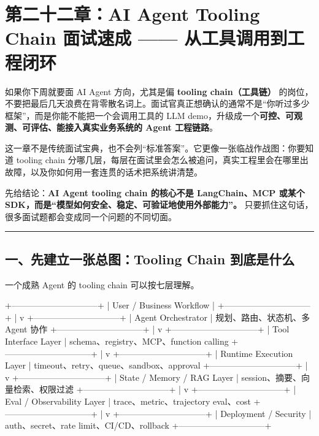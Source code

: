 \chapter{第二十二章：AI Agent Tooling Chain 面试速成 ------ 从工具调用到工程闭环}

如果你下周就要面 AI Agent 方向，尤其是偏 \textbf{tooling chain（工具链）} 的岗位，不要把最后几天浪费在背零散名词上。面试官真正想确认的通常不是``你听过多少框架''，而是你能不能把一个会调用工具的 LLM demo，升级成一个\textbf{可控、可观测、可评估、能接入真实业务系统的 Agent 工程链路}。


这一章不是传统面试宝典，也不会列``标准答案''。它更像一张临战作战图：你要知道 tooling chain 分哪几层，每层在面试里会怎么被追问，真实工程里会在哪里出故障，以及你如何用一套连贯的话术把系统讲清楚。


先给结论：\textbf{AI Agent tooling chain 的核心不是 LangChain、MCP 或某个 SDK，而是``模型如何安全、稳定、可验证地使用外部能力''。} 只要抓住这句话，很多面试题都会变成同一个问题的不同切面。


\bigskip\hrule\bigskip

\section{一、先建立一张总图：Tooling Chain 到底是什么}

一个成熟 Agent 的 tooling chain 可以按七层理解。


\begin{codeblock}
+------------------------------+
|  User / Business Workflow    |
+------------------------------+
              |
              v
+------------------------------+
|  Agent Orchestrator          |  规划、路由、状态机、多 Agent 协作
+------------------------------+
              |
              v
+------------------------------+
|  Tool Interface Layer        |  schema、registry、MCP、function calling
+------------------------------+
              |
              v
+------------------------------+
|  Runtime Execution Layer     |  timeout、retry、queue、sandbox、approval
+------------------------------+
              |
              v
+------------------------------+
|  State / Memory / RAG Layer  |  session、摘要、向量检索、权限过滤
+------------------------------+
              |
              v
+------------------------------+
|  Eval / Observability Layer  |  trace、metric、trajectory eval、cost
+------------------------------+
              |
              v
+------------------------------+
|  Deployment / Security       |  auth、secret、rate limit、CI/CD、rollback
+------------------------------+
\end{codeblock}

